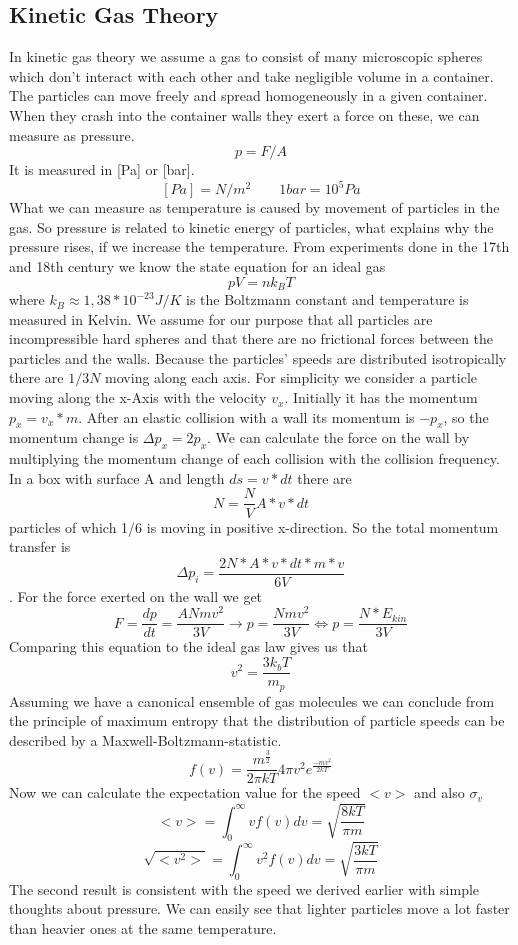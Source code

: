 \documentclass[]{article}
\begin{document}
\subsection{Kinetic Gas Theory}
In kinetic gas theory we assume a gas to consist of many microscopic spheres which don't interact with each other and take negligible volume in a container. The particles can move freely and spread homogeneously in a given container. When they crash into the container walls they exert a force on these, we can measure as pressure. 
\[ p=F/A \]
It is measured in [Pa] or [bar].
\[ [Pa]=N/m^{2}     \qquad  1bar=10^{5}Pa		 \]
What we can measure as temperature is caused by movement of particles in the gas. So pressure is related to kinetic energy of particles, what explains why the pressure rises, if we increase the temperature. From experiments done in the 17th and 18th century we know the state equation for an ideal gas
\[ pV=nk_{B} T\]
 where $k_{B}\approx1,38*10^{-23}J/K$ is the Boltzmann constant and temperature is measured in Kelvin. We assume for our purpose that all particles are incompressible hard spheres and that there are no frictional forces between the particles and the walls. Because the particles' speeds are distributed isotropically there are $1/3N$ moving along each axis. For simplicity we consider a particle moving along the x-Axis with the velocity $v_{x}$. Initially it has the momentum $p_{x}=v_{x}*m$. After an elastic collision with a wall its momentum is $-p_{x}$, so the momentum change is $\Delta p_{x}=2p_{x}$. We can calculate the force on the wall by multiplying the momentum change of each collision with the collision frequency. In a box with surface A and length $ds=v*dt$ there are \[ N=\frac{N}{V}A *v* dt \] particles of which 1/6 is moving in positive x-direction. So the total momentum transfer is \[ \Delta p_{i}=\frac{2N* A* v* dt*m* v}{6V} \]. For the force exerted on the wall we get \[ F=\frac{dp}{dt}=\frac{ANmv^{2}}{3V} \rightarrow p=\frac{Nmv^{2}}{3V} \Leftrightarrow p=\frac{N*E_{kin}}{3V}\] Comparing this equation to the ideal gas law gives us that \[ v^{2}=\frac{3k_{b}T}{m_{p}} \] 
 Assuming we have a canonical ensemble of gas molecules we can conclude from the principle of maximum entropy that the distribution of particle speeds can be described by a Maxwell-Boltzmann-statistic. \[ f(v)=\frac{m^{\frac{3}{2}}}{2\pi k T} 4\pi v^{2} e^{\frac{-mv^{2}}{2kT}} \] Now we can calculate the expectation value for the speed $<v>$ and also $\sigma_{v}$
 \[<v>=\int_{0}^{\infty}vf(v)dv=\sqrt{\frac{8kT}{\pi m}}  \]
 \[ \sqrt{<v^{2}>}=\int_{0}^{\infty}v^{2}f(v)dv=\sqrt{\frac{3kT}{\pi m}}  \]
 The second result is consistent with the speed we derived earlier with simple thoughts about pressure. We can easily see that lighter particles move a lot faster than heavier ones at the same temperature. 
\end{document}
